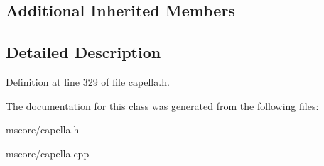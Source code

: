 \subsection*{Additional Inherited Members}


\subsection{Detailed Description}


Definition at line 329 of file capella.\+h.



The documentation for this class was generated from the following files\+:\begin{DoxyCompactItemize}
\item 
mscore/capella.\+h\item 
mscore/capella.\+cpp\end{DoxyCompactItemize}
